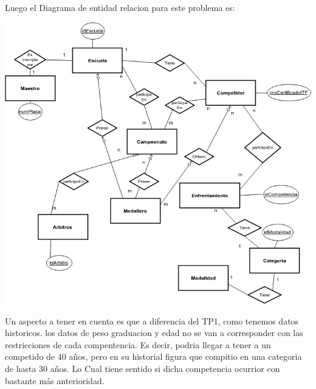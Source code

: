 Luego el Diagrama de entidad relacion para este problema es:


\includegraphics[scale=0.55]{diagDer.png}
 
 Un aspecto a tener en cuenta es que a diferencia del TP1, como tenemos 
 datos historicos. los datos de peso graduacion y edad no se van a corresponder
 con las restricciones  de cada compentencia. Es decir, podria llegar a tener a 
 un competido de 40 años, pero en su historial figura que compitio en una categoria
 de hasta 30 años. Lo Cual tiene sentido si dicha competencia ocurrior con 
 bastante más anterioridad.\\
